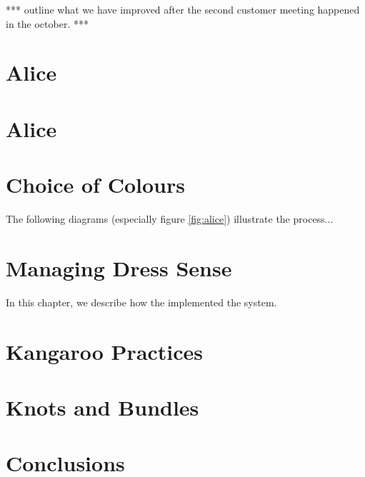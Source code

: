 \documentclass{l3proj}
\begin{document}
*** outline what we have improved after the second customer meeting happened in the october. ***


\section{Alice}
\label{sec:alice}



\section{Alice}
\label{sec:alice}




\section{Choice of Colours}
\label{design}

The following diagrams (especially figure \ref{fig:alice}) illustrate the
process...

\section{Managing Dress Sense}
\label{managing}

In this chapter, we describe how the implemented the system.

\section{Kangaroo Practices}



\section{Knots and Bundles}
\label{sec:managing}


\section{Conclusions}
\end{document}
